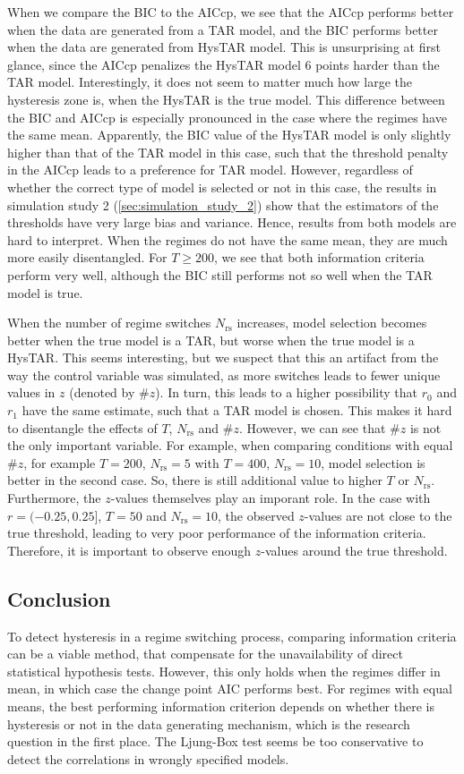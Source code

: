 \documentclass{article}
\begin{document}
When we compare the BIC to the AICcp, we see that the AICcp performs better when the data are generated from a TAR model, and the BIC performs better when the data are generated from HysTAR model. This is unsurprising at first glance, since the AICcp penalizes the HysTAR model 6 points harder than the TAR model. Interestingly, it does not seem to matter much how large the hysteresis zone is, when the HysTAR is the true model.
	This difference between the BIC and AICcp is especially pronounced in the case where the regimes have the same mean. Apparently, the BIC value of the HysTAR model is only slightly higher than that of the TAR model in this case, such that the threshold penalty in the AICcp leads to a preference for TAR model. However, regardless of whether the correct type of model is selected or not in this case, the results in simulation study 2 (\ref{sec:simulation_study_2}) show that the estimators of the thresholds have very large bias and variance. Hence, results from both models are hard to interpret.
	When the regimes do not have the same mean, they are much more easily disentangled. For $T\ge 200$, we see that both information criteria perform very well, although the BIC still performs not so well when the TAR model is true.

When the number of regime switches $N_{\mathrm{rs}}$ increases, model selection becomes better when the true model is a TAR, but worse when the true model is a HysTAR. 
This seems interesting, but we suspect that this an artifact from the way the control variable was simulated, as more switches leads to fewer unique values in $z$ (denoted by \#$z$). In turn, this leads to a higher possibility that $r_0$ and $r_1$ have the same estimate, such that a TAR model is chosen.
This makes it hard to disentangle the effects of $T$, $N_{\mathrm{rs}}$ and \#$z$.
However, we can see that \#$z$ is not the only important variable.
For example, when comparing conditions with equal \#$z$, for example $T = 200$, $N_{\mathrm{rs}} = 5$ with $T = 400$, $N_{\mathrm{rs}} = 10$, model selection is better in the second case.
So, there is still additional value to higher $T$ or $N_{\mathrm{rs}}$.
Furthermore, the $z$-values themselves play an imporant role. 
In the case with $r = (-0.25, 0.25]$, $T = 50$ and $N_{\mathrm{rs}} = 10$, the observed $z$-values are not close to the true threshold, leading to very poor performance of the information criteria.
Therefore, it is important to observe enough $z$-values around the true threshold.

\subsection{Conclusion}
To detect hysteresis in a regime switching process, comparing information criteria can be a viable method, that compensate for the unavailability of direct statistical hypothesis tests. However, this only holds when the regimes differ in mean, in which case the change point AIC performs best. For regimes with equal means, the best performing information criterion depends on whether there is hysteresis or not in the data generating mechanism, which is the research question in the first place. The Ljung-Box test seems be too conservative to detect the correlations in wrongly specified models.
\end{document}
